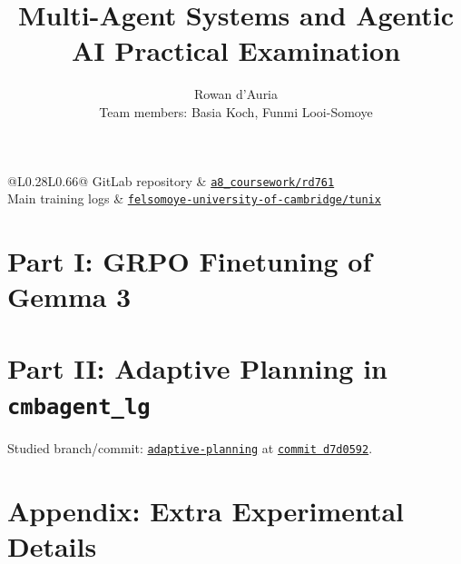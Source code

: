 \documentclass[11pt,a4paper]{article}
\title{Multi-Agent Systems and Agentic AI Practical Examination}
\author{%
Rowan d'Auria \\
Team members: Basia Koch, Funmi Looi-Somoye
}
\newcommand{\repo}{\href{https://gitlab.developers.cam.ac.uk/phy/data-intensive-science-mphil/assessments/a8_coursework/rd761}{\texttt{a8\_coursework/rd761}}}
\newcommand{\wandb}{\href{https://wandb.ai/felsomoye-university-of-cambridge/tunix}{\texttt{felsomoye-university-of-cambridge/tunix}}}
\begin{document}
\maketitle

\begin{center}
\begin{tabular}{@{}L{0.28\linewidth}L{0.66\linewidth}@{}}
\toprule
GitLab repository & \repo \\
Main training logs & \wandb \\
\bottomrule
\end{tabular}
\end{center}

\tableofcontents

\newpage

\section{Part I: GRPO Finetuning of Gemma 3}





\newpage



\newpage

\section{Part II: Adaptive Planning in \texttt{cmbagent\_lg}}

\noindent
Studied branch/commit:
\href{https://github.com/borisbolliet/cmbagent_lg/tree/d7d0592a714e4cc01c97f1b77afdd57a208b18db}{\texttt{adaptive-planning}}
at \href{https://github.com/borisbolliet/cmbagent_lg/commit/d7d0592a714e4cc01c97f1b77afdd57a208b18db}{\texttt{commit d7d0592}}.







\appendix
\setcounter{secnumdepth}{2}%
\section{Appendix: Extra Experimental Details}












\end{document}
